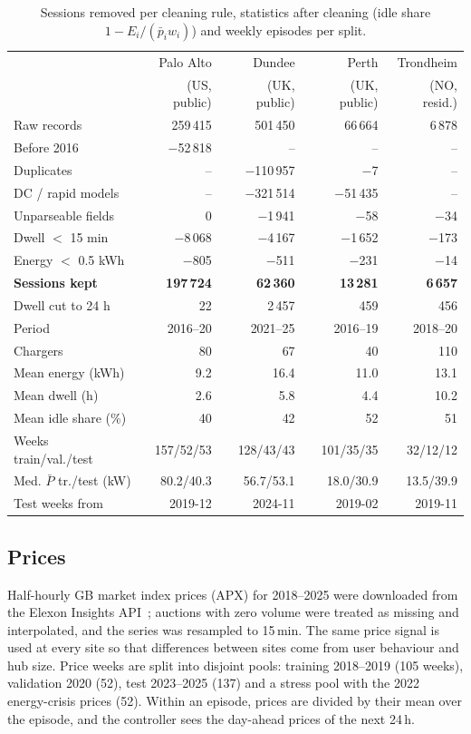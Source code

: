 \documentclass[conference]{IEEEtran}
\begin{document}
\begin{table}[t]
\caption{Sessions removed per cleaning rule, statistics after cleaning (idle share
$1-E_i/(\bar p_i w_i)$) and weekly episodes per split.}
\label{tab:data}
\centering
\footnotesize
\setlength{\tabcolsep}{1.5pt}
\begin{tabular}{lrrrr}
\toprule
 & Palo Alto & Dundee & Perth & Trondheim\\
 & (US, public) & (UK, public) & (UK, public) & (NO, resid.)\\
\midrule
Raw records & 259\,415 & 501\,450 & 66\,664 & 6\,878\\
Before 2016 & $-$52\,818 & -- & -- & --\\
Duplicates & -- & $-$110\,957 & $-$7 & --\\
DC / rapid models & -- & $-$321\,514 & $-$51\,435 & --\\
Unparseable fields & 0 & $-$1\,941 & $-$58 & $-$34\\
Dwell $<$ 15 min & $-$8\,068 & $-$4\,167 & $-$1\,652 & $-$173\\
Energy $<$ 0.5 kWh & $-$805 & $-$511 & $-$231 & $-$14\\
\textbf{Sessions kept} & \textbf{197\,724} & \textbf{62\,360} & \textbf{13\,281} & \textbf{6\,657}\\
Dwell cut to 24 h & 22 & 2\,457 & 459 & 456\\
\midrule
Period & 2016--20 & 2021--25 & 2016--19 & 2018--20\\
Chargers & 80 & 67 & 40 & 110\\
Mean energy (kWh) & 9.2 & 16.4 & 11.0 & 13.1\\
Mean dwell (h) & 2.6 & 5.8 & 4.4 & 10.2\\
Mean idle share (\%) & 40 & 42 & 52 & 51\\
\midrule
Weeks train/val./test & 157/52/53 & 128/43/43 & 101/35/35 & 32/12/12\\
Med. $\bar P$ tr./test (kW) & 80.2/40.3 & 56.7/53.1 & 18.0/30.9 & 13.5/39.9\\
Test weeks from & 2019-12 & 2024-11 & 2019-02 & 2019-11\\
\bottomrule
\end{tabular}
\end{table}

\subsection{Prices}
Half-hourly GB market index prices (APX) for 2018--2025 were downloaded from the Elexon Insights
API~\cite{elexon}; auctions with zero volume were treated as missing and interpolated, and the
series was resampled to 15\,min. The same price signal is used at every site so that differences
between sites come from user behaviour and hub size. Price weeks are split into disjoint pools:
training 2018--2019 (105 weeks), validation 2020 (52), test 2023--2025 (137) and a stress pool
with the 2022 energy-crisis prices (52). Within an episode, prices are divided by their mean over
the episode, and the controller sees the day-ahead prices of the next 24\,h.
\end{document}
